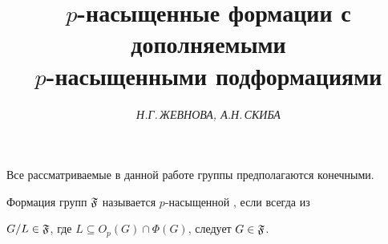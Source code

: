 

 




 


\newcommand{\form}{\operatorname{form}} 


\newcommand{\lform}{\operatorname{lform}} 


\newcommand{\Soc}{\operatorname{Soc}} 


 


\setcounter{page}{23} 








\author{\it Н.Г.\,ЖЕВНОВА, А.Н.\,СКИБА} 


\title {$p$-насыщенные формации с дополняемыми\\ 


$p$-насыщенными подформациями} 


 




\date{} 


\pagestyle{plain} 


 


 


\maketitle 


 


Все рассматриваемые в данной работе группы предполагаются конечными. 


 


Формация групп $\frak F$ называется $p$-насыщенной \cite{Dar}, если всегда из 


$G/L\in\frak F$, где $L\subseteq O_p(G)\cap\Phi(G)$, следует $G\in \frak F$. 


